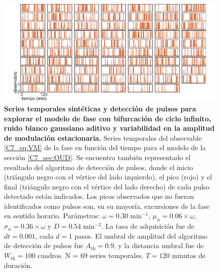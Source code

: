 \documentclass[./main.tex]{subfiles}
\begin{document}
\begin{subappendices}
\begin{figure}
    \centering
    \includegraphics[width=1\columnwidth]{figures/chapter7/C7_dist_traces_for_evaluation_VM.pdf} 
    \caption{\textbf{Series temporales sintéticas y detección de pulsos para explorar el modelo de fase con bifurcación de ciclo infinito, ruido blanco gaussiano aditivo y variabilidad en la amplitud de modulación estacionaria.} Series temporales del observable \ref{C7_eq:VM} de la fase en función del tiempo para el modelo de la sección \ref{C7_sec:OUD}. Se encuentra también representado el resultado del algoritmo de detección de pulsos, donde el inicio (triángulo negro con el vértice del lado izquierdo), el pico (rojo) y el final (triángulo negro con el vértice del lado derecho) de cada pulso detectado están indicados. Los picos observados que no fueron identificados como pulsos son, en su mayoría, excursiones de la fase en sentido horario. Parámetros: $\omega = 0.30 \; \text{min}^{-1}$, $\mu_{\alpha} = 0.06 \times \omega$, $ \sigma_{\alpha} = 0.36  \times \omega$ y $D = 0.54 \; \text{min}^{-2}$. La tasa de adquisición fue de $dt = 0.001$, cada $d = 1$ pasos. El umbral de amplitud del algoritmo de detección de pulsos fue $A_{\text{th}} = 0.9$, y la distancia umbral fue de $W_{\text{th}} = 100\text{ cuadros}$. N = $69$ series temporales. $T = 120$ minutos de duración.}
    \label{C7_fig:dist_traces_VM}
\end{figure}
\end{subappendices}
\end{document}
